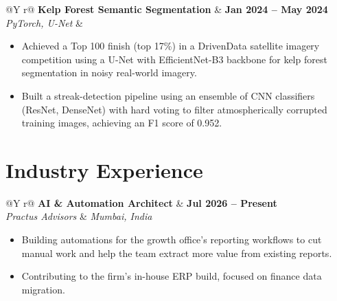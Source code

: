 \documentclass[11pt,letterpaper]{article}
\makeatletter
\newcommand{\cventry}[4]{%
    \begin{tabularx}{\linewidth}{@{}Y r@{}}
        \textbf{#1} & \textbf{\footnotesize #2} \\
        \textit{\footnotesize #3} & \textit{\footnotesize #4} \\
    \end{tabularx}%
    \vspace{0.3ex}
}
\makeatother
\begin{document}
%
 
\vspace{0.02ex}
 
\cventry{Kelp Forest Semantic Segmentation}{Jan 2024 -- May 2024}{PyTorch, U-Net}{}
\begin{itemize}
    \item Achieved a Top 100 finish (top 17\%) in a DrivenData satellite imagery competition using a U-Net with EfficientNet-B3 backbone for kelp forest segmentation in noisy real-world imagery.
    \item Built a streak-detection pipeline using an ensemble of CNN classifiers (ResNet, DenseNet) with hard voting to filter atmospherically corrupted training images, achieving an F1 score of 0.952.
\end{itemize}
 
\section*{Industry Experience}
\vspace{-0.5ex}
 
\cventry{AI \& Automation Architect}{Jul 2026 -- Present}{Practus Advisors}{Mumbai, India}
\begin{itemize}
    \item Building automations for the growth office's reporting workflows to cut manual work and help the team extract more value from existing reports.
    \item Contributing to the firm's in-house ERP build, focused on finance data migration.
\end{itemize}
 
\end{document}

